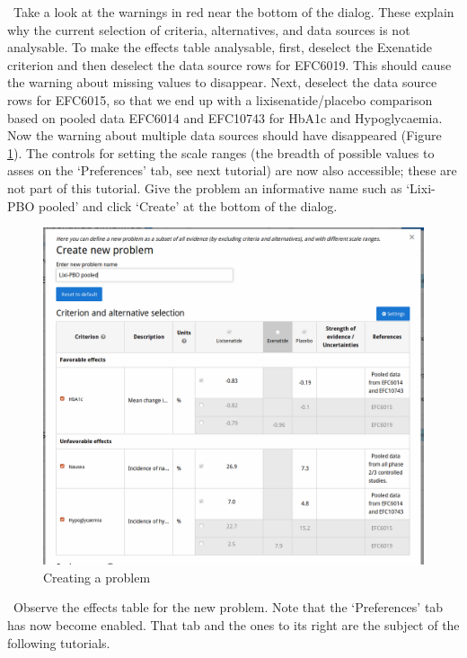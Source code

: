 \documentclass[00_mcda_tutorial.tex]{subfiles}
\begin{document}
\noindent \leftpointright \, Take a look at the warnings in red near the bottom of the dialog. These explain why the current selection of criteria, alternatives, and data sources is not analysable. To make the effects table analysable, first, deselect the Exenatide criterion and then deselect the data source rows for EFC6019. This should cause the warning about missing values to disappear. Next, deselect the data source rows for EFC6015, so that we end up with a lixisenatide/placebo comparison based on pooled data EFC6014 and EFC10743 for HbA1c and Hypoglycaemia. Now the warning about multiple data sources should have disappeared (Figure \ref{fig:create_lixi_placebo}). The controls for setting the scale ranges (the breadth of possible values to asses on the ‘Preferences’ tab, see next tutorial) are now also accessible; these are not part of this tutorial. Give the problem an informative name such as ‘Lixi-PBO pooled’ and click ‘Create’ at the bottom of the dialog.

\begin{figure}[!h]
    \centering
	\includegraphics[width=\textwidth]{fig/createLixiPlacebo.png}
    \caption{Creating a problem}
	\label{fig:create_lixi_placebo}
\end{figure}

\noindent \leftpointright \, Observe the effects table for the new problem. Note that the ‘Preferences’ tab has now become enabled. That tab and the ones to its right are the subject of the following tutorials.
\end{document}
